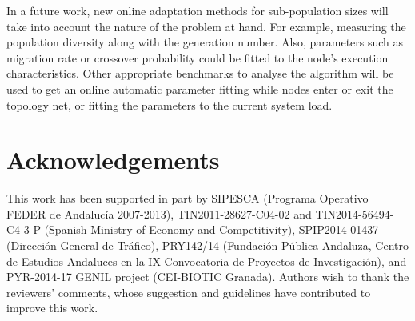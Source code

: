 \documentclass[final,1p,times]{elsarticle}
\begin{document}
In a future work, new online adaptation methods for sub-population sizes will take into account the nature of the problem at hand. For example, measuring the population diversity along with the generation number. Also, parameters such as migration rate or crossover probability could be fitted to the node's execution characteristics. Other appropriate benchmarks to analyse the algorithm will be used to get an online automatic parameter fitting while nodes enter or exit the topology net, or fitting the parameters to the current system load.

\section*{Acknowledgements}
This work has been supported in part by SIPESCA (Programa Operativo FEDER de Andaluc{\'i}a 2007-2013), TIN2011-28627-C04-02 and TIN2014-56494-C4-3-P (Spanish Ministry of Economy and Competitivity), SPIP2014-01437 (Direcci{\'o}n General de Tr{\'a}fico), PRY142/14 (Fundaci{\'o}n P{\'u}blica Andaluza, Centro de Estudios Andaluces en la IX Convocatoria de Proyectos de Investigaci{\'o}n), and PYR-2014-17 GENIL project (CEI-BIOTIC Granada). Authors wish to thank the reviewers' comments, whose suggestion and guidelines have contributed to improve this work.







%
%



\end{document}

